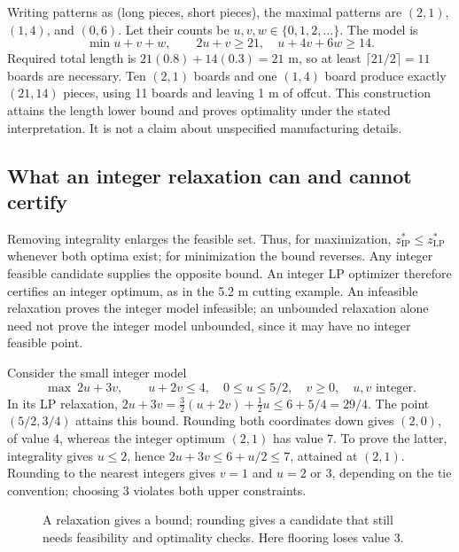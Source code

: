 \documentclass[11pt,a4paper]{article}
\begin{document}
Writing patterns as (long pieces, short pieces), the maximal patterns are
$(2,1)$, $(1,4)$, and $(0,6)$. Let their counts be $u,v,w\in\{0,1,2,\ldots\}$.
The model is
\[
  \min u+v+w,\qquad 2u+v\geq21,\quad u+4v+6w\geq14.
\]
Required total length is $21(0.8)+14(0.3)=21$ m, so at least
$\lceil21/2\rceil=11$ boards are necessary. Ten $(2,1)$ boards and one $(1,4)$
board produce exactly $(21,14)$ pieces, using 11 boards and leaving 1 m of offcut.
This construction attains the length lower bound and proves optimality under the
stated interpretation. It is not a claim about unspecified manufacturing details.

\subsection{What an integer relaxation can and cannot certify}\label{sec:integer-relaxation}
Removing integrality enlarges the feasible set. Thus, for maximization,
$z^*_{\mathrm{IP}}\leq z^*_{\mathrm{LP}}$ whenever both optima exist;
for minimization the bound reverses. Any integer feasible candidate supplies
the opposite bound. An integer LP optimizer therefore certifies an integer
optimum, as in the 5.2 m cutting example. An infeasible relaxation proves the
integer model infeasible; an unbounded relaxation alone need not prove the
integer model unbounded, since it may have no integer feasible point.

Consider the small integer model
\[
  \max\ 2u+3v,\qquad u+2v\leq4,\quad 0\leq u\leq5/2,\quad
  v\geq0,\quad u,v\text{ integer}.
\]
In its LP relaxation,
$2u+3v=\tfrac32(u+2v)+\tfrac12u\leq6+5/4=29/4$.
The point $(5/2,3/4)$ attains this bound. Rounding both coordinates down gives
$(2,0)$, of value 4, whereas the integer optimum $(2,1)$ has value 7.
To prove the latter, integrality gives $u\leq2$, hence
$2u+3v\leq6+u/2\leq7$, attained at $(2,1)$.
Rounding to the nearest integers gives $v=1$ and $u=2$ or 3, depending on the
tie convention; choosing 3 violates both upper constraints.

\begin{figure}[H]
  \centering
  \caption{A relaxation gives a bound; rounding gives a candidate that still
    needs feasibility and optimality checks. Here flooring loses value 3.}
  \label{fig:integer-relaxation}
\end{figure}
\end{document}
